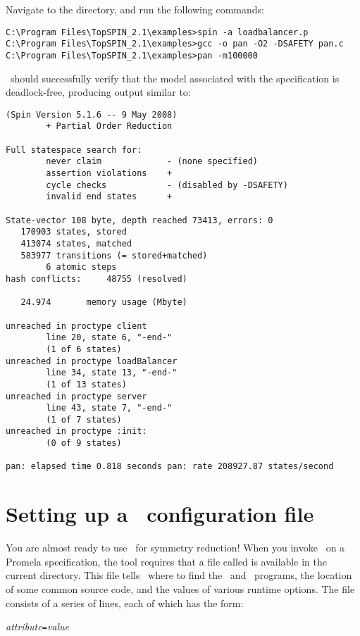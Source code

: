 Navigate to the  directory, and run the following
commands:
%
\begin{lstlisting}
C:\Program Files\TopSPIN_2.1\examples>spin -a loadbalancer.p
C:\Program Files\TopSPIN_2.1\examples>gcc -o pan -O2 -DSAFETY pan.c
C:\Program Files\TopSPIN_2.1\examples>pan -m100000
\end{lstlisting}
%
\spin\ should successfully verify that the model associated with the
specification is deadlock-free, producing output similar to:
%
\begin{lstlisting}
(Spin Version 5.1.6 -- 9 May 2008)
        + Partial Order Reduction

Full statespace search for:
        never claim             - (none specified)
        assertion violations    +
        cycle checks            - (disabled by -DSAFETY)
        invalid end states      +

State-vector 108 byte, depth reached 73413, errors: 0
   170903 states, stored
   413074 states, matched
   583977 transitions (= stored+matched)
        6 atomic steps
hash conflicts:     48755 (resolved)

   24.974       memory usage (Mbyte)

unreached in proctype client
        line 20, state 6, "-end-"
        (1 of 6 states)
unreached in proctype loadBalancer
        line 34, state 13, "-end-"
        (1 of 13 states)
unreached in proctype server
        line 43, state 7, "-end-"
        (1 of 7 states)
unreached in proctype :init:
        (0 of 9 states)

pan: elapsed time 0.818 seconds pan: rate 208927.87 states/second
\end{lstlisting}

\section{Setting up a \protect\topspin\ configuration file}\label{sec:example:configuration}

You are almost ready to use \topspin\ for symmetry reduction!  When
you invoke \topspin\ on a Promela specification, the tool requires
that a file called  is available in the current
directory.  This file tells \topspin\ where to find the \gap\ and
\saucy\ programs, the location of some common source code, and the
values of various runtime options. The file consists of a series of
lines, each of which has the form:

\vspace{2mm} \emph{attribute}\texttt{=}\emph{value} \vspace{2mm}

